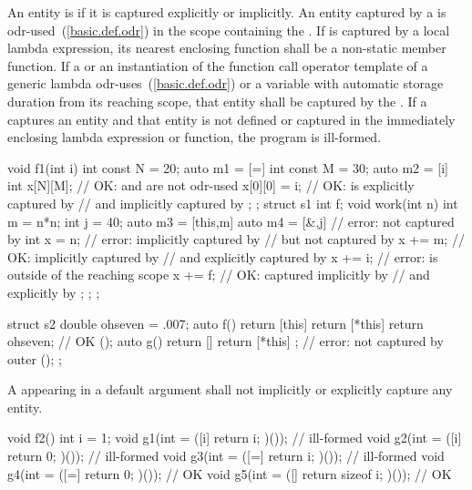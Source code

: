 \pnum
An entity is  if it is captured explicitly or implicitly. An entity
captured by a  is odr-used~(\ref{basic.def.odr}) in the scope
containing the . If  is captured by a local
lambda expression, its nearest enclosing function shall be a non-static member function.
If a  or an instantiation of the function call
operator template of a generic lambda odr-uses~(\ref{basic.def.odr})  or a
variable with automatic storage duration from its reaching scope, that
entity shall be captured by the . If a
 captures an entity and that entity is not defined or
captured in the immediately enclosing lambda expression or function, the program is
ill-formed. \begin{example}
%
\begin{codeblock}
void f1(int i) {
  int const N = 20;
  auto m1 = [=]{
    int const M = 30;
    auto m2 = [i]{
      int x[N][M];              // OK:  and  are not odr-used
      x[0][0] = i;              // OK:  is explicitly captured by 
                                // and implicitly captured by 
    };
  };
  struct s1 {
    int f;
    void work(int n) {
      int m = n*n;
      int j = 40;
      auto m3 = [this,m] {
        auto m4 = [&,j] {       // error:  not captured by 
          int x = n;            // error:  implicitly captured by 
                                // but not captured by 
          x += m;               // OK:  implicitly captured by 
                                // and explicitly captured by 
          x += i;               // error:  is outside of the reaching scope
          x += f;               // OK:  captured implicitly by 
                                // and explicitly by 
        };
      };
    }
  };
}

struct s2 {
  double ohseven = .007;
  auto f() {
    return [this] {
      return [*this] {
          return ohseven; // OK
      }
    }();
  }
  auto g() {
    return [] {
      return [*this] { }; // error:  not captured by outer 
    }();
  }
};
\end{codeblock}
\end{example}

\pnum
A  appearing in a default argument shall not
implicitly or explicitly capture any entity. \begin{example}

\begin{codeblock}
void f2() {
  int i = 1;
  void g1(int = ([i]{ return i; })());        // ill-formed
  void g2(int = ([i]{ return 0; })());        // ill-formed
  void g3(int = ([=]{ return i; })());        // ill-formed
  void g4(int = ([=]{ return 0; })());        // OK
  void g5(int = ([]{ return sizeof i; })());  // OK
}
\end{codeblock}
\end{example}

